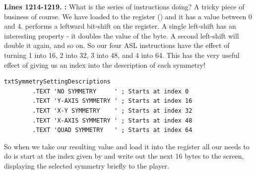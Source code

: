 \textbf{Lines 1214-1219. :} What is the series of  instructions doing? A tricky
piece of business of course. We have loaded  to the  register () and it has a value between 0 and 4.
 performs a leftward bit-shift on the  register. A single left-shift has an interesting property - it doubles the
value of the byte. A second left-shift will double it again, and so on. So our four {ASL} instructions have the effect of turning 1 into
16, 2 into 32, 3 into 48, and 4 into 64. This has the very useful effect of giving us an index into the description of each symmetry!

\begin{lstlisting}
txtSymmetrySettingDescriptions 
        .TEXT 'NO SYMMETRY     ' ; Starts at index 0
        .TEXT 'Y-AXIS SYMMETRY ' ; Starts at index 16
        .TEXT 'X-Y SYMMETRY    ' ; Starts at index 32
        .TEXT 'X-AXIS SYMMETRY ' ; Starts at index 48
        .TEXT 'QUAD SYMMETRY   ' ; Starts at index 64
\end{lstlisting}

So when we take our resulting value and load it into the  register all our  needs to do is start at the 
index given by  and write out the next 16 bytes to the screen, displaying the selected symmetry briefly to the player.


